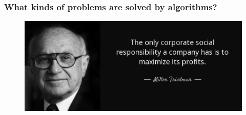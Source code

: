 \begin{frame}
    \frametitle{What kinds of problems are solved by algorithms?}

    \begin{figure}
        \centering
        \includegraphics[width = \linewidth]{./ch/images/ch1/04_max_profit.png}
    \end{figure}

\end{frame}